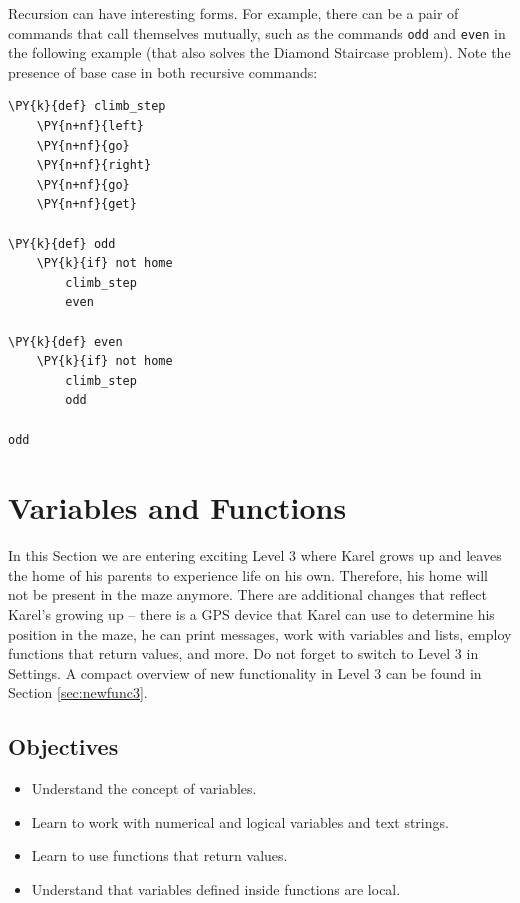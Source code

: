 Recursion can have interesting forms. For example, there can be a pair of commands
that call themselves mutually, such as the commands {\tt odd} and 
{\tt even} in the following example (that also solves the Diamond Staircase
problem). Note the presence of base case in both recursive commands:\\
 
\begin{bbox}
\begin{Verbatim}[commandchars=\\\{\}]
\PY{k}{def} climb_step
    \PY{n+nf}{left}
    \PY{n+nf}{go}
    \PY{n+nf}{right}
    \PY{n+nf}{go}
    \PY{n+nf}{get} 

\PY{k}{def} odd
    \PY{k}{if} not home
        climb_step
        even

\PY{k}{def} even
    \PY{k}{if} not home
        climb_step
        odd
    
odd
\end{Verbatim}
\end{bbox}


\section{Variables and Functions} \label{sec:var}

In this Section we are entering exciting Level 3 where Karel grows up and leaves the 
home of his parents to experience life on his own. Therefore, his home will not be 
present in the maze anymore. There are additional changes
that reflect Karel's growing up -- there is a GPS device that Karel can use to 
determine his position in the maze, he can print messages, work with variables and 
lists, employ functions that return values, and more. Do not forget to switch to 
Level 3 in Settings. A compact overview of new functionality in Level 3 can be found 
in Section \ref{sec:newfunc3}.

\subsection[\ \ Objectives]{Objectives} 
 
\begin{itemize}
\item Understand the concept of variables.
\item Learn to work with numerical and logical variables and text strings.
\item Learn to use functions that return values. 
\item Understand that variables defined inside functions are local. 
\end{itemize}

